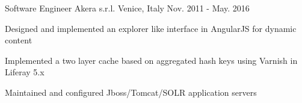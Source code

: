 \begin{cventries}
  \cventry
    {Software Engineer} %
    {Akera s.r.l.} %
    {Venice, Italy} %
    {Nov. 2011 - May. 2016} %
    {
      \begin{cvitems} %
        \item {Designed and implemented an explorer like interface in AngularJS for dynamic content}
        \item {Implemented a two layer cache based on aggregated hash keys using Varnish in Liferay 5.x}
        \item {Maintained and configured Jboss/Tomcat/SOLR application servers}
      \end{cvitems}
    }

\end{cventries}
